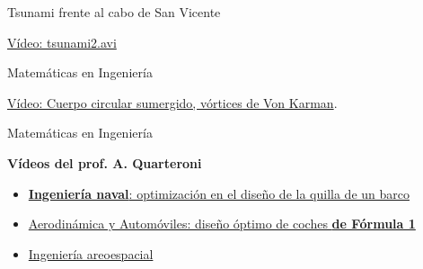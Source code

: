 \documentclass[
  unknownkeysallowed %
]{beamer}
\begin{document}
\begin{frame}{Tsunami frente al cabo de San Vicente}
  \par\hfill\scriptsize \href{https://www.youtube.com/watch?v=DkGmz0na00g}{Vídeo: tsunami2.avi}
\end{frame}

\begin{frame}{Matemáticas en Ingeniería}
  \par\hfill\scriptsize \href{https://www.youtube.com/watch?v=E1fPolQ-uTI}{Vídeo: Cuerpo circular sumergido, vórtices de Von Karman}.
\end{frame}

\begin{frame}{Matemáticas en Ingeniería}

  {\large\bf Vídeos del prof. A. Quarteroni}
  \bigskip
  \begin{itemize}\itemsep1em
  \item \href{https://youtu.be/8W4oFOymiyM?t=995}{\textbf{Ingeniería
        naval}: optimización en el diseño de la quilla de un barco}
  \item \href{https://youtu.be/8W4oFOymiyM?t=888}{Aerodinámica y
      Automóviles: diseño óptimo de coches \textbf{de Fórmula 1}}
  \item \href{https://youtu.be/8W4oFOymiyM?t=887}{Ingeniería areoespacial}
  \end{itemize}
\end{frame}
\end{document}
